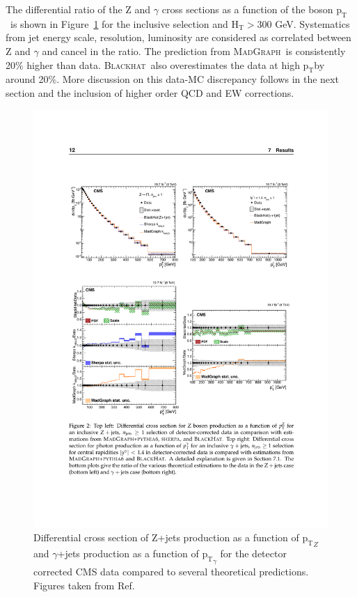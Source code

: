 \documentclass[a4paper,11pt,notoc]{article}
\newcommand{\pt}{\ensuremath{\mathrm{p_T}}}
\newcommand{\Ht}{\ensuremath{\mathrm{H_T}}}
\newcommand{\BLACKHAT}{\textsc{Blackhat}}
\newcommand{\MADGRAPH}{\textsc{MadGraph}}
\begin{document}
The differential ratio of the Z and $\gamma$ cross sections as a function of the boson \pt\ is shown in Figure~\ref{fig:ptZgamma-CMS} for the inclusive selection and $\Ht > 300$ GeV. Systematics from jet energy scale, resolution, luminosity are considered as correlated between Z and $\gamma$ and cancel in the ratio. The prediction from \MADGRAPH\ is consistently 20\% higher than data. \BLACKHAT\ also overestimates the data at high \pt by around 20\%. More discussion on this data-MC discrepancy follows in the next section and the inclusion of higher order QCD and EW corrections. 

\begin{figure}[t!]
\centering
\includegraphics[width=0.9\columnwidth]{ptZ-ptgamma-CMS.pdf} 
\caption{Differential cross section of Z+jets production as a function of $\pt_{Z}$ and $\gamma$+jets production as a function of $\pt_{\gamma}$ for the detector corrected CMS data compared to several theoretical predictions. Figures taken from Ref.~\cite{Khachatryan:2015ira}}
\label{fig:ptZgamma-CMS}
\end{figure}   
\end{document}
